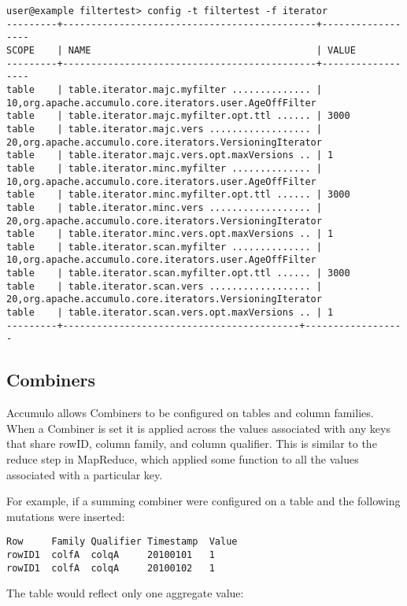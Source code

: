\small
\begin{verbatim}
user@example filtertest> config -t filtertest -f iterator
---------+---------------------------------------------+------------------
SCOPE    | NAME                                        | VALUE
---------+---------------------------------------------+------------------
table    | table.iterator.majc.myfilter .............. | 10,org.apache.accumulo.core.iterators.user.AgeOffFilter
table    | table.iterator.majc.myfilter.opt.ttl ...... | 3000
table    | table.iterator.majc.vers .................. | 20,org.apache.accumulo.core.iterators.VersioningIterator
table    | table.iterator.majc.vers.opt.maxVersions .. | 1
table    | table.iterator.minc.myfilter .............. | 10,org.apache.accumulo.core.iterators.user.AgeOffFilter
table    | table.iterator.minc.myfilter.opt.ttl ...... | 3000
table    | table.iterator.minc.vers .................. | 20,org.apache.accumulo.core.iterators.VersioningIterator
table    | table.iterator.minc.vers.opt.maxVersions .. | 1
table    | table.iterator.scan.myfilter .............. | 10,org.apache.accumulo.core.iterators.user.AgeOffFilter
table    | table.iterator.scan.myfilter.opt.ttl ...... | 3000
table    | table.iterator.scan.vers .................. | 20,org.apache.accumulo.core.iterators.VersioningIterator
table    | table.iterator.scan.vers.opt.maxVersions .. | 1
---------+------------------------------------------+------------------
\end{verbatim}
\normalsize

\subsection{Combiners}

Accumulo allows Combiners to be configured on tables and column
families. When a Combiner is set it is applied across the values
associated with any keys that share rowID, column family, and column qualifier.
This is similar to the reduce step in MapReduce, which applied some function to all
the values associated with a particular key.

For example, if a summing combiner were configured on a table and the following
mutations were inserted:

\small
\begin{verbatim}
Row     Family Qualifier Timestamp  Value
rowID1  colfA  colqA     20100101   1
rowID1  colfA  colqA     20100102   1
\end{verbatim}
\normalsize

The table would reflect only one aggregate value:

